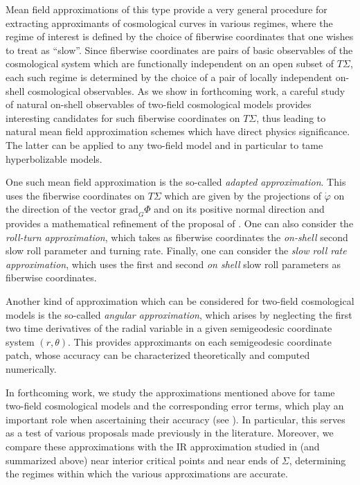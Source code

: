\documentclass[a4paper,11pt]{article}
\theoremstyle{plain}
\theoremstyle{definition}
\theoremstyle{remark}
\def\grad{\mathrm{grad}}
\begin{document}
Mean field approximations of this type provide a very general
procedure for extracting approximants of cosmological curves in
various regimes, where the regime of interest is defined by the choice
of fiberwise coordinates that one wishes to treat as ``slow''. Since
fiberwise coordinates are pairs of basic observables of the
cosmological system which are functionally independent on an open
subset of $T\Sigma$, each such regime is determined by the choice of a
pair of locally independent on-shell cosmological observables.  As we
show in forthcoming work, a careful study of natural on-shell
observables of two-field cosmological models provides interesting
candidates for such fiberwise coordinates on $T\Sigma$, thus leading
to natural mean field approximation schemes which have direct physics
significance.  The latter can be applied to any two-field model and in
particular to tame hyperbolizable models.

One such mean field approximation is the so-called {\em adapted
  approximation}. This uses the fiberwise coordinates on $T\Sigma$
which are given by the projections of $\dot{\varphi}$ on the direction
of the vector $\grad_G \Phi$ and on its positive normal direction and
provides a mathematical refinement of the proposal of
\cite{Bjorkmo}. One can also consider the {\em roll-turn
  approximation}, which takes as fiberwise coordinates the {\em
  on-shell} second slow roll parameter and turning rate. Finally, one
can consider the {\em slow roll rate approximation}, which uses the
first and second {\em on shell} slow roll parameters as fiberwise
coordinates.

Another kind of approximation which can be considered for two-field
cosmological models is the so-called {\em angular approximation},
which arises by neglecting the first two time derivatives of the
radial variable in a given semigeodesic coordinate system
$(r,\theta)$. This provides approximants on each semigeodesic
coordinate patch, whose accuracy can be characterized theoretically
and computed numerically.

In forthcoming work, we study the approximations mentioned above for
tame two-field cosmological models and the corresponding error terms,
which play an important role when ascertaining their accuracy (see
\cite{AL}).  In particular, this serves as a test of various proposals
made previously in the literature. Moreover, we compare these
approximations with the IR approximation studied in \cite{grad} (and
summarized above) near interior critical points and near ends of
$\Sigma$, determining the regimes within which the various
approximations are accurate.
\end{document}
